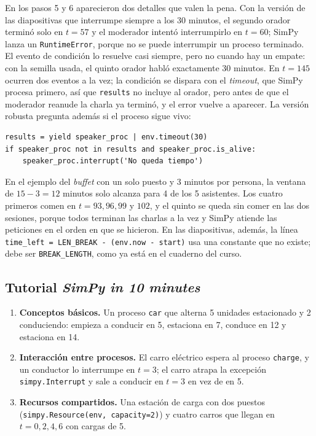 \documentclass[11pt,letterpaper]{article}
\begin{document}
En los pasos 5 y 6 aparecieron dos detalles que valen la pena. Con la versión de las diapositivas que
interrumpe siempre a los 30 minutos, el segundo orador terminó solo en $t = 57$ y el moderador intentó
interrumpirlo en $t = 60$; SimPy lanza un \texttt{RuntimeError}, porque no se puede interrumpir un proceso
terminado. El evento de condición lo resuelve casi siempre, pero no cuando hay un empate: con la semilla
usada, el quinto orador habló exactamente 30 minutos. En $t = 145$ ocurren dos eventos a la vez; la condición se
dispara con el \emph{timeout}, que SimPy procesa primero, así que \texttt{results} no incluye al orador, pero
antes de que el moderador reanude la charla ya terminó, y el error vuelve a aparecer. La versión robusta pregunta
además si el proceso sigue vivo:

\begin{lstlisting}
results = yield speaker_proc | env.timeout(30)
if speaker_proc not in results and speaker_proc.is_alive:
    speaker_proc.interrupt('No queda tiempo')
\end{lstlisting}

En el ejemplo del \emph{buffet} con un solo puesto y 3 minutos por persona, la ventana de $15 - 3 = 12$ minutos
solo alcanza para 4 de los 5 asistentes. Los cuatro primeros comen en $t = 93, 96, 99$ y $102$, y el quinto se
queda sin comer en las dos sesiones, porque todos terminan las charlas a la vez y SimPy atiende las peticiones
en el orden en que se hicieron. En las diapositivas, además, la línea
\texttt{time\_left = LEN\_BREAK - (env.now - start)} usa una constante que no existe; debe ser
\texttt{BREAK\_LENGTH}, como ya está en el cuaderno del curso.

\subsection{Tutorial \emph{SimPy in 10 minutes}}

\begin{enumerate}[itemsep=2pt]
\item \textbf{Conceptos básicos.} Un proceso \texttt{car} que alterna 5 unidades estacionado y 2 conduciendo:
empieza a conducir en 5, estaciona en 7, conduce en 12 y estaciona en 14.
\item \textbf{Interacción entre procesos.} El carro eléctrico espera al proceso \texttt{charge}, y un conductor
lo interrumpe en $t = 3$; el carro atrapa la excepción \texttt{simpy.Interrupt} y sale a conducir en $t = 3$ en
vez de en 5.
\item \textbf{Recursos compartidos.} Una estación de carga con dos puestos
(\texttt{simpy.Resource(env, capacity=2)}) y cuatro carros que llegan en $t = 0, 2, 4, 6$ con cargas de 5.
\end{enumerate}
\end{document}
